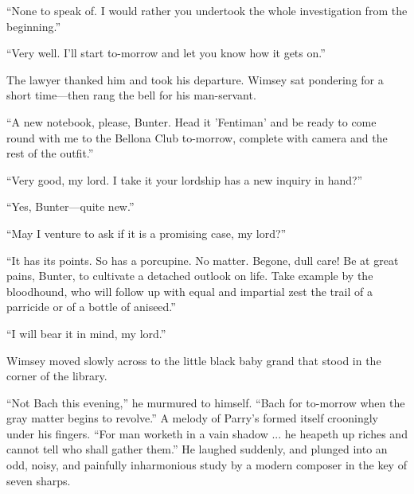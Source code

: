 \enquote{None to speak of. I would rather you undertook the whole investigation from the beginning.}

\enquote{Very well. I'll start to-morrow and let you know how it gets on.}

The lawyer thanked him and took his departure. Wimsey sat pondering for a short time\allowbreak---\allowbreak then rang the bell for his man-servant.

\enquote{A new notebook, please, Bunter. Head it 'Fentiman' and be ready to come round with me to the Bellona Club to-morrow, complete with camera and the rest of the outfit.}

\enquote{Very good, my lord. I take it your lordship has a new inquiry in hand?}

\enquote{Yes, Bunter\allowbreak---\allowbreak quite new.}

\enquote{May I venture to ask if it is a promising case, my lord?}

\enquote{It has its points. So has a porcupine. No matter. Begone, dull care! Be at great pains, Bunter, to cultivate a detached outlook on life. Take example by the bloodhound, who will follow up with equal and impartial zest the trail of a parricide or of a bottle of aniseed.}

\enquote{I will bear it in mind, my lord.}

Wimsey moved slowly across to the little black baby grand that stood in the corner of the library.

\enquote{Not Bach this evening,} he murmured to himself. \enquote{Bach for to-morrow when the gray matter begins to revolve.} A melody of Parry's formed itself crooningly under his fingers. \enquote{For man worketh in a vain shadow ... he heapeth up riches and cannot tell who shall gather them.} He laughed suddenly, and plunged into an odd, noisy, and painfully inharmonious study by a modern composer in the key of seven sharps.